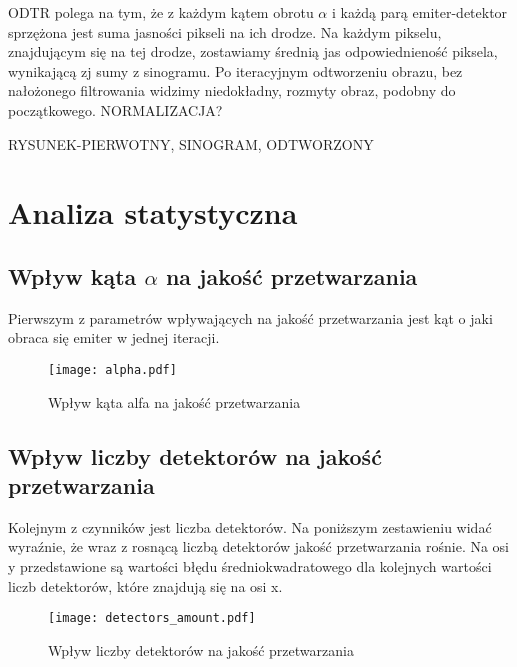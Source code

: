 \documentclass{article}
\begin{document}
ODTR polega na tym, że z każdym kątem obrotu $\alpha$ i każdą parą emiter-detektor sprzężona jest suma jasności pikseli na ich drodze. Na każdym pikselu, znajdującym się na tej drodze, zostawiamy średnią jas odpowiednieność piksela, wynikającą zj sumy z sinogramu. Po iteracyjnym odtworzeniu obrazu, bez nałożonego filtrowania widzimy niedokładny, rozmyty obraz, podobny do początkowego. NORMALIZACJA? 

RYSUNEK-PIERWOTNY, SINOGRAM, ODTWORZONY

\clearpage %


\section{Analiza statystyczna}
\label{sec_analiza_statystyczna}

\subsection{Wpływ kąta $\alpha$ na jakość przetwarzania}
\label{subsec_alpha_comparison}

Pierwszym z parametrów wpływających na jakość przetwarzania jest kąt o jaki obraca się emiter w jednej iteracji. 

\begin{figure}[!htbp]
\begin{center}
\texttt{[image: alpha.pdf]}
\end{center}
\caption{Wpływ kąta alfa na jakość przetwarzania}
\label{fig:detectors_amount}
\end{figure}


\subsection{Wpływ liczby detektorów na jakość przetwarzania}
\label{subsec_detectors_amount_comparison}

Kolejnym z czynników jest liczba detektorów. Na poniższym zestawieniu widać wyraźnie, że wraz z rosnącą liczbą detektorów jakość przetwarzania rośnie. Na osi y przedstawione są wartości błędu średniokwadratowego dla kolejnych wartości liczb detektorów, które znajdują się na osi x. 

\begin{figure}[!htbp]
\begin{center}
\texttt{[image: detectors\_amount.pdf]}
\end{center}
\caption{Wpływ liczby detektorów na jakość przetwarzania}
\label{fig:detectors_amount}
\end{figure}
\end{document}
